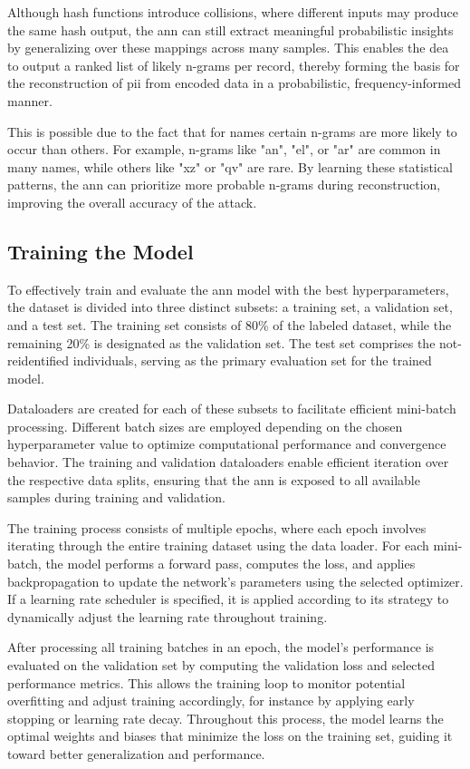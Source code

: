 Although hash functions introduce collisions, where different inputs may produce the same hash output, the \ac{ann} can still extract meaningful probabilistic insights by generalizing over these mappings across many samples.
This enables the \ac{dea} to output a ranked list of likely n-grams per record, thereby forming the basis for the reconstruction of \ac{pii} from encoded data in a probabilistic, frequency-informed manner.

This is possible due to the fact that for names certain n-grams are more likely to occur than others. For example, n-grams like "an", "el", or "ar" are common in many names, while others like "xz" or "qv" are rare. By learning these statistical patterns, the \ac{ann} can prioritize more probable n-grams during reconstruction, improving the overall accuracy of the attack.

\subsection{Training the Model} \label{sec:training}

To effectively train and evaluate the \ac{ann} model with the best hyperparameters, the dataset is divided into three distinct subsets: a training set, a validation set, and a test set.
The training set consists of 80\% of the labeled dataset, while the remaining 20\% is designated as the validation set.
The test set comprises the not-reidentified individuals, serving as the primary evaluation set for the trained model.

Dataloaders are created for each of these subsets to facilitate efficient mini-batch processing.
Different batch sizes are employed depending on the chosen hyperparameter value to optimize computational performance and convergence behavior.
The training and validation dataloaders enable efficient iteration over the respective data splits, ensuring that the \ac{ann} is exposed to all available samples during training and validation.

The training process consists of multiple epochs, where each epoch involves iterating through the entire training dataset using the data loader.
For each mini-batch, the model performs a forward pass, computes the loss, and applies backpropagation to update the network’s parameters using the selected optimizer.
If a learning rate scheduler is specified, it is applied according to its strategy to dynamically adjust the learning rate throughout training.

After processing all training batches in an epoch, the model’s performance is evaluated on the validation set by computing the validation loss and selected performance metrics.
This allows the training loop to monitor potential overfitting and adjust training accordingly, for instance by applying early stopping or learning rate decay.
Throughout this process, the model learns the optimal weights and biases that minimize the loss on the training set, guiding it toward better generalization and performance.

